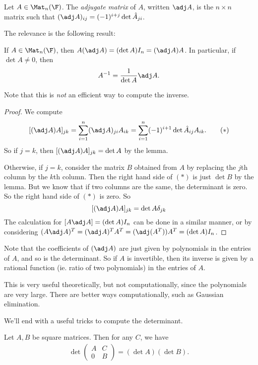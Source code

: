 \documentclass[a4paper]{article}
\begin{document}
\begin{defi}
  Let $A \in \Mat_n(\F)$. The \emph{adjugate matrix} of $A$, written $\adj A$, is the $n\times n$ matrix such that $(\adj A)_{ij} = (-1)^{i + j} \det\hat{A}_{ji}$.
\end{defi}

The relevance is the following result:
\begin{thm}
  If $A \in \Mat_n(\F)$, then $A(\adj A) = (\det A) I_n = (\adj A)A$. In particular, if $\det A \not= 0$, then
  \[
    A^{-1} = \frac{1}{\det A}\adj A.
  \]
\end{thm}
Note that this is \emph{not} an efficient way to compute the inverse.

\begin{proof}
  We compute
  \[
    [(\adj A)A]_{jk} = \sum_{i = 1}^n (\adj A)_{ji} A_{ik} = \sum_{i = 1}^n (-1)^{i + 1} \det\hat{A}_{ij} A_{ik}.\tag{$*$}
  \]
  So if $j = k$, then $[(\adj A)A]_{jk} = \det A$ by the lemma.

  Otherwise, if $j = k$, consider the matrix $B$ obtained from $A$ by replacing the $j$th column by the $k$th column. Then the right hand side of $(*)$ is just $\det B$ by the lemma. But we know that if two columns are the same, the determinant is zero. So the right hand side of $(*)$ is zero. So
  \[
    [(\adj A)A]_{jk} = \det A \delta_{jk}
  \]
  The calculation for $[A\adj A] = (\det A) I_n$ can be done in a similar manner, or by considering $(A\adj A)^T = (\adj A)^T A^T = (\adj (A^T)) A^T = (\det A) I_n$.
\end{proof}
Note that the coefficients of $(\adj A)$ are just given by polynomials in the entries of $A$, and so is the determinant. So if $A$ is invertible, then its inverse is given by a rational function (ie. ratio of two polynomials) in the entries of $A$.

This is very useful theoretically, but not computationally, since the polynomials are very large. There are better ways computationally, such as Gaussian elimination.

We'll end with a useful tricks to compute the determinant.
\begin{lemma}
  Let $A, B$ be square matrices. Then for any $C$, we have
  \begin{align*}
    \det
    \begin{pmatrix}
      A & C\\
      0 & B
    \end{pmatrix}
    = (\det A) (\det B).
  \end{align*}
\end{lemma}
\end{document}
